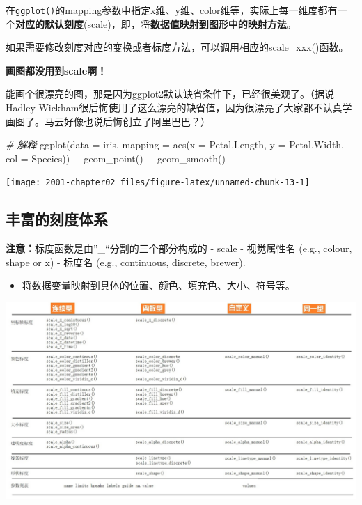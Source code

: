 \documentclass[
]{book}
\newenvironment{Shaded}{\begin{snugshade}}{\end{snugshade}}
\newcommand{\AttributeTok}[1]{\textcolor[rgb]{0.77,0.63,0.00}{#1}}
\newcommand{\CommentTok}[1]{\textcolor[rgb]{0.56,0.35,0.01}{\textit{#1}}}
\newcommand{\FunctionTok}[1]{\textcolor[rgb]{0.00,0.00,0.00}{#1}}
\newcommand{\NormalTok}[1]{#1}
\newcommand{\SpecialCharTok}[1]{\textcolor[rgb]{0.00,0.00,0.00}{#1}}
\providecommand{\tightlist}{%
  \setlength{\itemsep}{0pt}\setlength{\parskip}{0pt}}
\begin{document}
在\texttt{ggplot()}的mapping参数中指定x维、y维、color维等，实际上每一维度都有一个\textbf{对应的默认刻度}(scale)，即，将\textbf{数据值映射到图形中的映射方法}。

如果需要修改刻度对应的变换或者标度方法，可以调用相应的scale\_xxx()函数。

\textbf{画图都没用到scale啊！}

能画个很漂亮的图，那是因为ggplot2默认缺省条件下，已经很美观了。（据说Hadley
Wickham很后悔使用了这么漂亮的缺省值，因为很漂亮了大家都不认真学画图了。马云好像也说后悔创立了阿里巴巴？）

\begin{Shaded}
\begin{Highlighting}[]
\CommentTok{\# 解释}
\FunctionTok{ggplot}\NormalTok{(}\AttributeTok{data =}\NormalTok{ iris, }\AttributeTok{mapping =} \FunctionTok{aes}\NormalTok{(}\AttributeTok{x =}\NormalTok{ Petal.Length, }\AttributeTok{y =}\NormalTok{ Petal.Width, }\AttributeTok{col =}\NormalTok{ Species)) }\SpecialCharTok{+} 
    \FunctionTok{geom\_point}\NormalTok{() }\SpecialCharTok{+} \FunctionTok{geom\_smooth}\NormalTok{()}
\end{Highlighting}
\end{Shaded}

\begin{center}\texttt{[image: 2001-chapter02\_files/figure-latex/unnamed-chunk-13-1]} \end{center}

\hypertarget{ux4e30ux5bccux7684ux523bux5ea6ux4f53ux7cfb}{%
\subsection{丰富的刻度体系}\label{ux4e30ux5bccux7684ux523bux5ea6ux4f53ux7cfb}}

\textbf{注意：}标度函数是由''\_``分割的三个部分构成的 - scale - 视觉属性名
(e.g., colour, shape or x) - 标度名 (e.g., continuous, discrete,
brewer).

\begin{itemize}
\tightlist
\item
  将数据变量映射到具体的位置、颜色、填充色、大小、符号等。
\end{itemize}

\includegraphics{figure/23.jpg}
\end{document}
